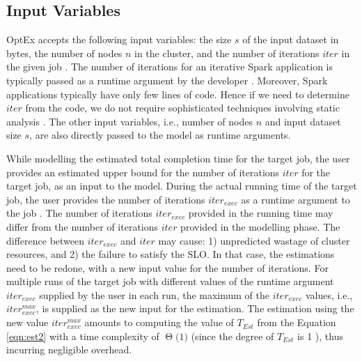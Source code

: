 \documentclass[conference]{IEEEtran}
\begin{document}
\subsection{Input Variables} \label{sec:var}
OptEx accepts the following input variables:
the size $s$ of the input dataset in bytes, the number of nodes $n$ in the cluster, and
   the number of iterations $\mathit{iter}$ in the given job \cite{Zaharia:2012:RDD:2228298.2228301}.
    The
number of iterations for an iterative Spark application is typically passed as a runtime argument by the developer
\cite{Zaharia:2012:RDD:2228298.2228301}. Moreover, Spark applications typically have only  few lines of code. Hence if we need to determine $iter$ from the code, we do not require sophisticated techniques involving static analysis \cite{Zuleger:2011:BAI:2041552.2041574}. The other input variables, i.e., number of nodes $n$
and input dataset size $s$, are also directly
 passed to the model as runtime arguments.
 \par  While modelling the estimated total completion time for the target job, the user provides an
   estimated upper bound for the number of iterations $\mathit{iter}$ for the target job, as an input to the
   model. During the actual running time of the target job, the user provides the number of iterations
   $\mathit{\mathit{iter}_{exec}}$ as a
   runtime argument to the job \cite{Zaharia:2012:RDD:2228298.2228301}.
   The number of iterations $\mathit{\mathit{iter}_{exec}}$ provided in the running time may differ from
    the number of iterations $\mathit{iter}$ provided in the modelling phase.  The difference between
   $\mathit{\mathit{iter}_{exec}}$ and $\mathit{iter}$ may cause: 1) unpredicted
  wastage of cluster resources, and 2) the failure to satisfy the SLO.
  \newcommand{\BigTheta}[1]{\ensuremath{\operatorname{\Theta}\bigl(#1\bigr)}}
In that case, the estimations need to be  redone, with a new input value for the number of iterations. For multiple runs of the target job with different values of the runtime argument
  $\mathit{\mathit{iter}_{exec}}$ supplied by the user in each run, the maximum of the $\mathit{\mathit{iter}_{exec}}$
  values, i.e., $\mathit{\mathit{iter}_{\mathit{exec}}^{\mathit{max}}}$, is supplied as the new input for the estimation.
   The estimation using the new value $\mathit{\mathit{iter}_{\mathit{exec}}^{\mathit{max}}}$ amounts to computing the value of $\mathit{T_{\mathit{Est}}}$ from
     the Equation \ref{eqn:est2} with a time complexity of \BigTheta{1} (since the degree of
     $\mathit{T_{\mathit{Est}}}$ is 1 \cite{leader2004numerical}), thus incurring negligible overhead.
\end{document}
